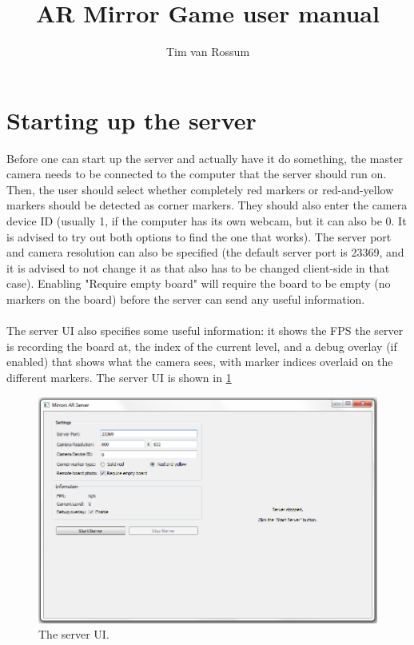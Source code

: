 \documentclass[]{report}
\title{AR Mirror Game user manual}
\author{Tim van Rossum}
\begin{document}
\maketitle
\section*{Starting up the server}
Before one can start up the server and actually have it do something, the master
camera needs to be connected to the computer that the server should run on. 
Then, the user should select whether completely red markers or red-and-yellow
markers should be detected as corner markers. They should also enter the camera
device ID (usually 1, if the computer has its own webcam, but it can also be 0.
It is advised to try out both options to find the one that works). The server
port and camera resolution can also be specified (the default server port is 
23369, and it is advised to not change it as that also has to be changed
client-side in that case). Enabling "Require empty board" will require the board
to be empty (no markers on the board) before the server can send any useful
information.\\
\\
The server UI also specifies some useful information: it shows the FPS the
server is recording the board at, the index of the current level, and a debug
overlay (if enabled) that shows what the camera sees, with marker indices
overlaid on the different markers. The server UI is shown in \ref{fig:serverui}
\begin{figure}[!ht]
	\centering
	\includegraphics[scale = 0.5]{MirrorServerUI}
	\caption{The server UI.}
	\label{fig:serverui}
\end{figure}
\end{document}

